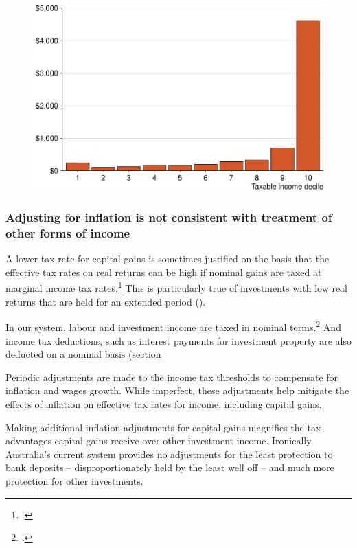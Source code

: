 \documentclass{grattan}\usepackage[]{graphicx}\usepackage[]{color}
\newcommand\gao{Grattan analysis of}
\begin{document}
\begin{figure}
\includegraphics[width=\columnwidth]{figure/Nearly_eighty_per_cent_of_capital_gains_are_earned_by_those_-1}
\source{\gao\ \textcite{ATO2013i}}
\end{figure}
\subsubsection{Adjusting for inflation is not consistent with treatment of other forms of income}
A lower tax rate for capital gains is sometimes justified on the basis that the effective tax rates on real returns can be high if nominal gains are taxed at marginal income tax rates.\footcite{Treasury2010} This is particularly true of investments with low real returns that are held for an extended period ().

In our system, labour and investment income are taxed in nominal terms.\footcite{Treasury2010}  And income tax deductions, such as interest payments for investment property are also deducted on a nominal basis (section 

Periodic adjustments are made to the income tax thresholds to compensate for inflation and wages growth. While imperfect, these adjustments help mitigate the effects of inflation on effective tax rates for income, including capital gains.

Making additional inflation adjustments for capital gains magnifies the tax advantages capital gains receive over other investment income. Ironically Australia's current system provides no adjustments for the least protection to bank deposits -- disproportionately held by the least well off -- and much more protection for other investments.
\end{document}
